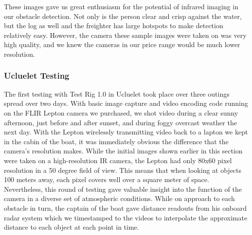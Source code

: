 These images gave us great enthusiasm for the potential of infrared imaging in our obstacle detection. Not only is the person clear and crisp against the water, but the log as well and the freighter has large hotspots to make detection relatively easy. However, the camera these sample images were taken on was very high quality, and we knew the cameras in our price range would be much lower resolution.

\subsubsection{\label{sec:discussion:results:testrig1}Ucluelet Testing}

The first testing with Test Rig 1.0 in Ucluelet took place over three outings spread over two days. With basic image capture and video encoding code running on the FLIR Lepton camera we purchased, we shot video during a clear sunny afternoon, just before and after sunset, and during foggy overcast weather the next day. With the Lepton wirelessly transmitting video back to a lapton we kept in the cabin of the boat, it was immediately obvious the difference that the camera's resolution makes. While the initial images shown earlier in this section were taken on a high-resolution IR camera, the Lepton had only 80x60 pixel resolution in a 50 degree field of view. This means that when looking at objects 100 meters away, each pixel covers well over a square meter of space. Nevertheless, this round of testing gave valuable insight into the function of the camera in a diverse set of atmospheric conditions. While on approach to each obstacle in turn, the captain of the boat gave distance readouts from his onboard radar system which we timestamped to the videos to interpolate the approximate distance to each object at each point in time.

